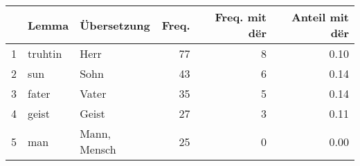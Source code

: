 \begin{tabular}{rllrrr}
  \hline
 & Lemma & Übersetzung & Freq. & Freq. mit dër & Anteil mit dër \\ 
  \hline
1 & truhtin & Herr &  77 &   8 & 0.10 \\ 
  2 & sun & Sohn &  43 &   6 & 0.14 \\ 
  3 & fater & Vater &  35 &   5 & 0.14 \\ 
  4 & geist & Geist &  27 &   3 & 0.11 \\ 
  5 & man & Mann, Mensch &  25 &   0 & 0.00 \\ 
   \hline
\end{tabular}
